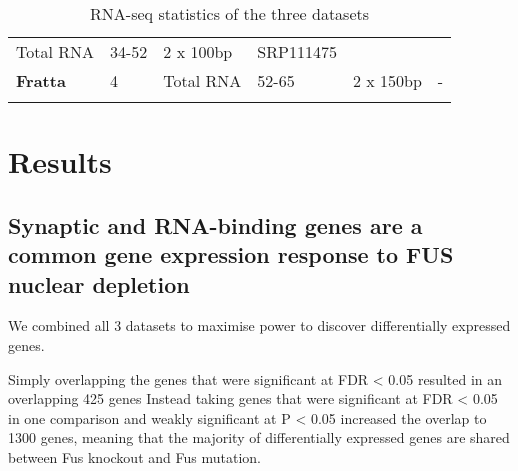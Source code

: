 \begin{longtable}[]{@{}llllll@{}}
\begin{minipage}[t]{0.14\columnwidth}
		{Total RNA}\strut
	\end{minipage} & \begin{minipage}[t]{0.14\columnwidth}\raggedright\strut
		{34-52}\strut
	\end{minipage} & \begin{minipage}[t]{0.14\columnwidth}\raggedright\strut
		{2 x 100bp}\strut
	\end{minipage} & \begin{minipage}[t]{0.14\columnwidth}\raggedright\strut
		{SRP111475}\strut
	\end{minipage}\tabularnewline
	\begin{minipage}[t]{0.14\columnwidth}\raggedright\strut
		{\textbf{Fratta} }\strut
	\end{minipage} & \begin{minipage}[t]{0.14\columnwidth}\raggedright\strut
		{4}\strut
	\end{minipage} & \begin{minipage}[t]{0.14\columnwidth}\raggedright\strut
		{Total RNA}\strut
	\end{minipage} & \begin{minipage}[t]{0.14\columnwidth}\raggedright\strut
		{52-65}\strut
	\end{minipage} & \begin{minipage}[t]{0.14\columnwidth}\raggedright\strut
		{2 x 150bp}\strut
	\end{minipage} & \begin{minipage}[t]{0.14\columnwidth}\raggedright\strut
		{-}\strut
	\end{minipage}\tabularnewline
	\bottomrule
	\caption{RNA-seq statistics of the three datasets}
	\label{tab:fus_sequencing}
\end{longtable}



\section{Results}

\subsection{Synaptic and RNA-binding genes are a common gene expression response to FUS nuclear depletion}
We combined all 3 datasets to maximise power to discover differentially expressed genes. 

Simply overlapping the genes that were significant at FDR < 0.05 resulted in an overlapping 425 genes
Instead taking genes that were significant at FDR < 0.05 in one comparison and weakly significant at P < 0.05 increased the overlap to 1300 genes,  meaning that the majority of differentially expressed genes are shared between Fus knockout and Fus mutation.

